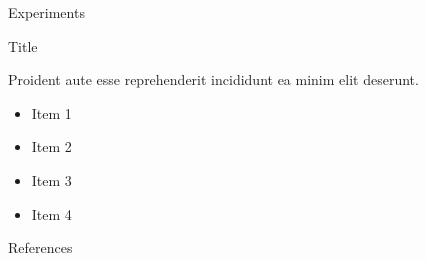 \documentclass[final]{beamer}
\newlength{\onecolwid}
\begin{document}
\begin{frame}[t]
\begin{columns}[t]
\begin{column}{\onecolwid}
\begin{block}{Experiments}
        \end{block}


        \begin{block}{Title}
        
            Proident aute esse reprehenderit incididunt ea minim elit deserunt.

            \begin{itemize}
                \item Item 1
                \item Item 2
                \item Item 3
                \item Item 4
            \end{itemize}

        \end{block}
        
        
        
        
        
        
        \begin{block}{References}
        
        {
            
            \small
            \vspace{0.2in}
        }
        

\end{block}
\end{column}
\end{columns}
\end{frame}
\end{document}
